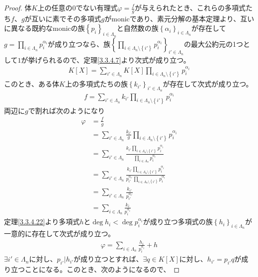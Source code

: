 \documentclass[dvipdfmx]{jsarticle}
\begin{document}
\begin{proof}
体$K$上の任意の$0$でない有理式$\varphi = \frac{f}{g}$が与えられたとき、これらの多項式たち$f$、$g$が互いに素でその多項式$g$がmonicであり、素元分解の基本定理より、互いに異なる既約なmonicの族$\left\{ p_{i} \right\}_{i \in \varLambda_{n}}$と自然数の族$\left\{ \alpha_{i} \right\}_{i \in \varLambda_{n}}$が存在して$g = \prod_{i \in \varLambda_{n}} p_{i}^{\alpha_{i}}$が成り立つなら、族$\left\{ \prod_{i \in \varLambda_{n} \setminus \left\{ i' \right\}} p_{i}^{\alpha_{i}} \right\}_{i' \in \varLambda_{n}}$の最大公約元の1つとして$1$が挙げられるので、定理\ref{3.3.4.7}より次式が成り立つ。
\begin{align*}
K[ X] = \sum_{i' \in \varLambda_{n}} {K[ X]\prod_{i \in \varLambda_{n} \setminus \left\{ i' \right\}} p_{i}^{\alpha_{i}}}
\end{align*}
このとき、ある体$K$上の多項式たちの族$\left\{ k_{i'} \right\}_{i' \in \varLambda_{n}}$が存在して次式が成り立つ。
\begin{align*}
f = \sum_{i' \in \varLambda_{n}} {k_{i'}\prod_{i \in \varLambda_{n} \setminus \left\{ i' \right\}} p_{i}^{\alpha_{i}}}
\end{align*}
両辺に$g$で割れば次のようになり
\begin{align*}
\varphi &= \frac{f}{g}\\
&= \sum_{i' \in \varLambda_{n}} {\frac{k_{i'}}{g}\prod_{i \in \varLambda_{n} \setminus \left\{ i' \right\}} p_{i}^{\alpha_{i}}}\\
&= \sum_{i' \in \varLambda_{n}} \frac{k_{i'}\prod_{i \in \varLambda_{n} \setminus \left\{ i' \right\}} p_{i}^{\alpha_{i}}}{\prod_{i \in \varLambda_{n}} p_{i}^{\alpha_{i}}}\\
&= \sum_{i' \in \varLambda_{n}} \frac{k_{i'}\prod_{i \in \varLambda_{n} \setminus \left\{ i' \right\}} p_{i}^{\alpha_{i}}}{p_{i'}^{\alpha_{i'}}\prod_{i \in \varLambda_{n} \setminus \left\{ i' \right\}} p_{i}^{\alpha_{i}}}\\
&= \sum_{i' \in \varLambda_{n}} \frac{k_{i'}}{p_{i'}^{\alpha_{i'}}}\\
&= \sum_{i \in \varLambda_{n}} \frac{k_{i}}{p_{i}^{\alpha_{i}}}
\end{align*}
定理\ref{3.3.4.22}より多項式$h$と$\deg h_{i} < \deg p_{i}^{\alpha_{i}}$が成り立つ多項式の族$\left\{ h_{i} \right\}_{i \in \varLambda_{n}}$が一意的に存在して次式が成り立つ。
\begin{align*}
\varphi = \sum_{i \in \varLambda_{n}} \frac{h_{i}}{p_{i}^{\alpha_{i}}} + h
\end{align*}
$\exists i' \in \varLambda_{n}$に対し、$p_{i'}|h_{i'}$が成り立つとすれば、$\exists q \in K[ X]$に対し、$h_{i'} = p_{i'}q$が成り立つことになる。このとき、次のようになるので、

\end{proof}
\end{document}
